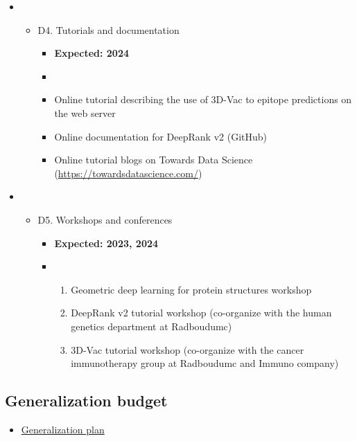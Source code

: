 \begin{itemize}
\item \begin{itemize}
\item D4. Tutorials and documentation
\begin{itemize}
\item \textbf{Expected: 2024}
\item {}
\item Online tutorial describing the use of 3D-Vac to epitope predictions on the web server
\item Online documentation for DeepRank v2 (GitHub)
\item Online tutorial blogs on Towards Data Science (\url{https://towardsdatascience.com/})
\end{itemize}
\end{itemize}
\end{itemize}



\begin{itemize}
\item \begin{itemize}
\item D5. Workshops and conferences
\begin{itemize}
\item \textbf{Expected: 2023, 2024}
\item {}
\begin{enumerate}[label=\alph*.]
\item Geometric deep learning for protein structures workshop
\item DeepRank v2 tutorial workshop (co-organize with the human genetics department at Radboudumc)
\item 3D-Vac tutorial workshop (co-organize with the cancer immunotherapy group at Radboudumc and Immuno company)
\end{enumerate}
\end{itemize}
\end{itemize}
\end{itemize}




\subsection*{Generalization budget}

\begin{itemize}
\item \href{https://nlesc.sharepoint.com/:w:/s/all/ERrdfYPm_2ZOgUUXyXRxx7wBuZIZJNIKS9pSH20kdDMdig?e=VS0mTQ}{Generalization plan}
\end{itemize}



